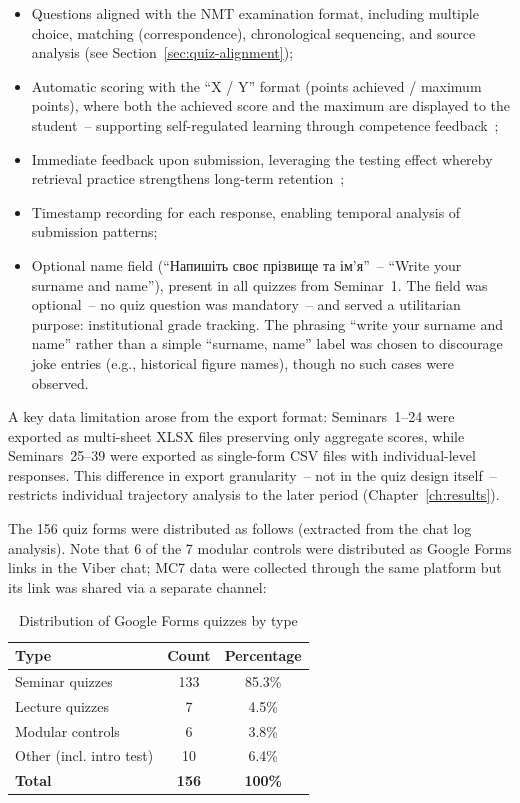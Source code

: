 \begin{itemize}
\item Questions aligned with the NMT examination format, including multiple choice, matching (correspondence), chronological sequencing, and source analysis (see Section~\ref{sec:quiz-alignment});
\item Automatic scoring with the ``X / Y'' format (points achieved / maximum points), where both the achieved score and the maximum are displayed to the student~-- supporting self-regulated learning through competence feedback~\cite{NicolMacfarlane2006, Hattie2009};
\item Immediate feedback upon submission, leveraging the testing effect whereby retrieval practice strengthens long-term retention~\cite{RoedigerButler2011, Dunlosky2013};
\item Timestamp recording for each response, enabling temporal analysis of submission patterns;
\item Optional name field (``Напишіть своє прізвище та ім'я''~-- ``Write your surname and name''), present in all quizzes from Seminar~1. The field was optional~-- no quiz question was mandatory~-- and served a utilitarian purpose: institutional grade tracking. The phrasing ``write your surname and name'' rather than a simple ``surname, name'' label was chosen to discourage joke entries (e.g., historical figure names), though no such cases were observed.
\end{itemize}

\noindent A key data limitation arose from the export format: Seminars~1--24 were exported as multi-sheet XLSX files preserving only aggregate scores, while Seminars~25--39 were exported as single-form CSV files with individual-level responses. This difference in export granularity~-- not in the quiz design itself~-- restricts individual trajectory analysis to the later period (Chapter~\ref{ch:results}).

The 156 quiz forms were distributed as follows (extracted from the chat log analysis). Note that 6 of the 7 modular controls were distributed as Google Forms links in the Viber chat; MC7 data were collected through the same platform but its link was shared via a separate channel:

\begin{table}[!h]
\centering
\caption{Distribution of Google Forms quizzes by type}
\label{tab:quiz-distribution}
\begin{tabular}{lcc}
\hline
\textbf{Type} & \textbf{Count} & \textbf{Percentage} \\
\hline
Seminar quizzes & 133 & 85.3\% \\
Lecture quizzes & 7 & 4.5\% \\
Modular controls & 6 & 3.8\% \\
Other (incl. intro test) & 10 & 6.4\% \\
\hline
\textbf{Total} & \textbf{156} & \textbf{100\%} \\
\hline
\end{tabular}
\end{table}

